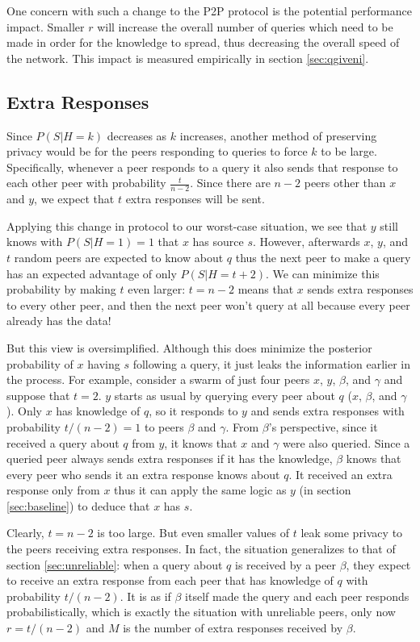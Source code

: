 \documentclass{article}
\newcommand{\secref}[1]{section \ref{sec:#1}}
\begin{document}
One concern with such a change to the P2P protocol is the potential performance
impact. Smaller $r$ will increase the overall number of queries which need to be
made in order for the knowledge to spread, thus decreasing the overall speed of
the network. This impact is measured empirically in \secref{qgiveni}.

\subsection{Extra Responses}\label{sec:exre}

Since $P(S|H=k)$ decreases as $k$ increases, another method of
preserving privacy would be for the peers responding to queries to force $k$ to
be large. Specifically, whenever a peer responds to a query it also
sends that response to each other peer with probability
$\frac{t}{n-2}$. Since there are $n-2$ peers other than $x$ and $y$, we expect
that $t$ extra responses will be sent.

Applying this change in protocol to our worst-case situation, we see that $y$
still knows with $P(S|H=1)=1$ that $x$ has source $s$. However, afterwards $x$,
$y$, and $t$ random peers are expected to know about $q$ thus the next peer
to make a query has an expected advantage of only $P(S|H=t+2)$. We can minimize this
probability by making $t$ even larger: $t=n-2$ means that $x$ sends extra
responses to every other peer, and then the next peer won't query at all because
every peer already has the data!

But this view is oversimplified. Although this does minimize the posterior
probability of $x$ having $s$ following a query, it just leaks the
information earlier in the process. For example, consider a swarm of just four
peers $x$, $y$, $\beta$, and $\gamma$ and suppose that $t=2$. $y$ starts as usual by
querying every peer about $q$ ($x$, $\beta$, and $\gamma$). Only $x$ has knowledge of
$q$, so it responds to $y$ and sends extra responses with probability
$t/(n-2)=1$ to peers $\beta$ and $\gamma$. From $\beta$'s perspective, since it received a
query about $q$ from $y$, it knows that $x$ and $\gamma$ were also queried. Since a
queried peer always sends extra responses if it has the knowledge, $\beta$ knows that
every peer who sends it an extra response knows about $q$. It received an extra
response only from $x$ thus it can apply the same logic as $y$ (in
\secref{baseline}) to deduce that $x$ has $s$.

Clearly, $t=n-2$ is too large. But even smaller values of $t$ leak some privacy to the
peers receiving extra responses. In fact, the situation generalizes to that of
\secref{unreliable}: when a query about $q$ is received by a peer $\beta$,
they expect to receive an extra response from each peer that has knowledge of
$q$ with probability $t/(n-2)$. It is as if $\beta$ itself made the query and each
peer responds probabilistically, which is exactly the situation with unreliable
peers, only now $r=t/(n-2)$ and $M$ is the number of extra responses received by
$\beta$.
\end{document}
